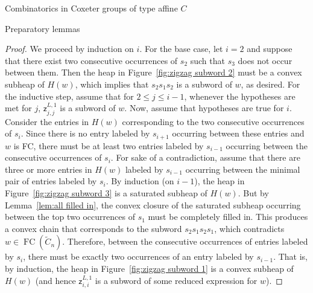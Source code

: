 \documentclass[11pt]{amsart}
\theoremstyle{definition}
\numberwithin{equation}{section}
\newcommand{\C}{\widetilde{C}}
\newcommand{\z}{\mathsf{z}}
\renewcommand{\(}{\left(}
\renewcommand{\)}{\right)}
\DeclareMathOperator{\FC}{FC}
\begin{document}
\begin{section}{Combinatorics in Coxeter groups of type affine $C$}
\begin{subsection}{Preparatory lemmas}
\begin{proof}
We proceed by induction on $i$.  For the base case, let $i=2$ and suppose that there exist two consecutive occurrences of $s_{2}$ such that $s_{3}$ does not occur between them.  Then the heap in Figure~\ref{fig:zigzag subword 2} must be a convex subheap of $H(w)$, which implies that $s_{2}s_{1}s_{2}$ is a subword of $w$, as desired.  For the inductive step, assume that for $2\leq j \leq i-1$, whenever the hypotheses are met for $j$, $\z_{j,j}^{L,1}$ is a subword of $w$.  Now, assume that hypotheses are true for $i$.  Consider the entries in $H(w)$ corresponding to the two consecutive occurrences of $s_{i}$.  Since there is no entry labeled by $s_{i+1}$ occurring between these entries and $w$ is FC, there must be at least two entries labeled by $s_{i-1}$ occurring between the consecutive occurrences of $s_{i}$.  For sake of a contradiction, assume that there are three or more entries in $H(w)$ labeled by $s_{i-1}$ occurring between the minimal pair of entries labeled by $s_{i}$.  By induction (on $i-1$), the heap in Figure~\ref{fig:zigzag subword 3} is a saturated subheap of $H(w)$.  But by Lemma~\ref{lem:all filled in}, the convex closure of the saturated subheap occurring between the top two occurrences of $s_{1}$ must be completely filled in.  This produces a convex chain that corresponds to the subword $s_{2}s_{1}s_{2}s_{1}$, which contradicts $w \in \FC(\C_{n})$.  Therefore, between the consecutive occurrences of entries labeled by $s_{i}$, there must be exactly two occurrences of an entry labeled by $s_{i-1}$.  That is, by induction, the heap in Figure~\ref{fig:zigzag subword 1} is a convex subheap of $H(w)$ (and hence $\z_{i,i}^{L,1}$ is a subword of some reduced expression for $w$).
\end{proof}


\end{subsection}
\end{section}
\end{document}
